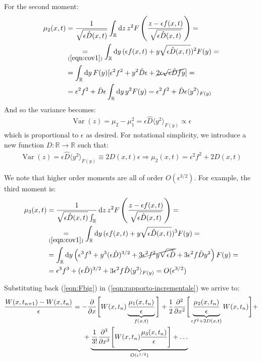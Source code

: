 \documentclass[../template.tex]{subfiles}
\begin{document}
For the second moment:
\begin{align*}
    \mu_2(x,t) &= \frac{1}{\sqrt{\epsilon \hat{D}(x,t)}} \int_{\mathbb{R}} \dd{z} z^2  F\left(\frac{z-\epsilon f(x,t)}{\sqrt{\epsilon \hat{D}(x,t)}} \right) =\\
    &\underset{(\ref{eqn:cov1})}{=} \int_{\mathbb{R}} \dd{y} (\epsilon f(x,t) + y \sqrt{\epsilon \hat{D}(x,t)})^2 F(y) =\\
    &= \int_{\mathbb{R}} \dd{y} F(y) [\epsilon^2 f^2 + y^2 \hat{D} \epsilon + \cancel{2 \epsilon \sqrt{\epsilon} \hat{D} f y}] =\\
    &= \epsilon^2 f^2 + \hat{D} \epsilon \int_{\mathbb{R}} \dd{y} y^2 F(y) = \epsilon^2 f^2 + \hat{D} \epsilon \langle y^2 \rangle_{F(y)}
\end{align*}
And so the variance becomes:
\begin{align*}
    \operatorname{Var}(z) = \mu_2 - \mu_1^2 = \epsilon \hat{D} \langle y^2 \rangle_{F(y)} \propto \epsilon
\end{align*}
which is proportional to $\epsilon$ as desired. For notational simplicity, we introduce a new function $D\colon \mathbb{R} \to \mathbb{R}$ such that:
\begin{align*}
    \operatorname{Var}(z) = \epsilon\hat{D} \langle y^2 \rangle_{F(y)} \equiv 2 D(x,t) \epsilon \Rightarrow \mu_2(x,t) = \epsilon^2 f^2 + 2 D(x,t)   
\end{align*} 

We note that higher order moments are all of order $O(\epsilon^{3/2})$. For example, the third moment is:
\begin{align*}
    \mu_3(x,t) &= \frac{1}{\sqrt{\epsilon \hat{D}(x,t)} \int_{\mathbb{R}}} \dd{z} z^2 F\left(\frac{z- \epsilon f(x,t)}{\sqrt{\epsilon \hat{D}(x,t)}} \right) = \\ 
    &\underset{(\ref{eqn:cov1})}{=} \int_{\mathbb{R}} \dd{y} (\epsilon f(x,t) + y \sqrt{\epsilon \hat{D}(x,t)})^3 F(y) =\\
    &= \int_{\mathbb{R}} \dd{y} \left(\epsilon^3 f^3 + y^3 (\epsilon \hat{D})^{3/2} + \cancel{3 \epsilon^2 f^2 y \sqrt{\epsilon \hat{D}}} + 3 \epsilon^2 f \hat{D} y^2\right) F(y) =\\
    &= \epsilon^3 f^3 + (\epsilon \hat{D})^{3/2} + 3 \epsilon^2 f \hat{D} \langle y^2 \rangle_{F(y)} = O(\epsilon^{3/2})
\end{align*} 

Substituting back (\ref{eqn:Fbig}) in (\ref{eqn:rapporto-incrementale}) we arrive to:
\begin{align*}
    \frac{W(x, t_{n+1}) - W(x,t_n)}{\epsilon} &= -\pdv{x} \Bigg[W(x,t_n) \underbrace{\frac{\mu_1(x,t_n)}{\epsilon}}_{f(x,t)}  \Bigg] + \frac{1}{2} \pdv[2]{x} \Bigg[ \underbrace{\frac{\mu_2(x,t_n)}{\epsilon}}_{\epsilon f^2 + 2D(x,t)}  W(x,t_n)\Bigg]  +\\
    &\quad\>\>+ \underbrace{\frac{1}{3!} \pdv[3]{x} \Bigg[W(x,t_n) \frac{\mu_3 (x,t_n)}{\epsilon} \Bigg] + \dots}_{O(\epsilon^{1/2})} 
\end{align*}
\end{document}
